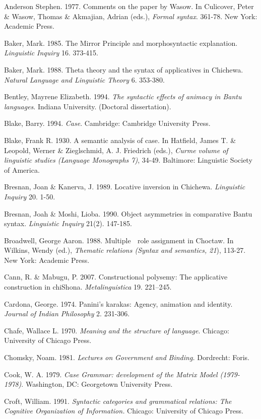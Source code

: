 \documentclass[output=paper]{langsci/langscibook}
\begin{document}
Anderson Stephen. 1977. Comments on the paper by Wasow. In Culicover, Peter \& Wasow, Thomas \& Akmajian, Adrian (eds.),\textit{ Formal syntax}. 361-78. New York: Academic Press.

Baker, Mark. 1985. The Mirror Principle and morphosyntactic explanation. \textit{Linguistic}\textit{ }\textit{Inquiry} 16. 373-415.

Baker, Mark. 1988. Theta theory and the syntax of applicatives in Chichewa. \textit{Natural Language and Linguistic Theory }6. 353-380.

Bentley, Mayrene Elizabeth. 1994. \textit{The syntactic effects of animacy in Bantu languages}. Indiana University. (Doctoral dissertation).

Blake, Barry. 1994. \textit{Case}. Cambridge: Cambridge University Press.

Blake, Frank R. 1930. A semantic analysis of case. In Hatfield, James T. \& Leopold, Werner \& Zieglschmid, A. J. Friedrich (eds.), \textit{Curme volume of linguistic studies (Language Monographs 7)}, 34-49. Baltimore: Linguistic Society of America.

Bresnan, Joan \& Kanerva, J. 1989. Locative inversion in Chichewa. \textit{Linguistic Inquiry }20. 1-50.

Bresnan, Joah \& Moshi, Lioba. 1990. Object asymmetries in comparative Bantu syntax. \textit{Linguistic Inquiry} 21(2). 147-185.

Broadwell, George Aaron. 1988. Multiple  role assignment in Choctaw. In Wilkins, Wendy (ed.),\textit{ Thematic relations (Syntax and semantics, 21}), 113-27. New York: Academic Press.

Cann, R. \& Mabugu, P. 2007. Constructional polysemy: The applicative construction in chiShona. \textit{Metalinguistica }19. 221–245.

Cardona, George. 1974. Panini’s karakas: Agency, animation and identity. \textit{Journal of Indian Philosophy }2. 231-306.

Chafe, Wallace L. 1970. \textit{Meaning and the structure of language}. Chicago: University of Chicago Press.

Chomsky, Noam. 1981. \textit{Lectures on}\textit{ }\textit{Government}\textit{ }\textit{and}\textit{ }\textit{Binding}\textit{. }Dordrecht:\textit{ }Foris.

Cook, W. A. 1979. \textit{Case Grammar: development of the Matrix Model (1979-1978)}. Washington, DC: Georgetown University Press.

Croft, William. 1991.\textit{ }\textit{Syntactic categories and grammatical relations: The Cognitive Organization of Information.} Chicago: University of Chicago Press.
\end{document}
